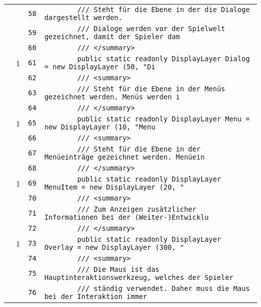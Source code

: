 \documentclass[a4paper,10pt]{article}
\begin{document}
\begin{longtable}[l]{lrrl}
\cellcolor{gray} &  & \verb~58~ & \verb~        /// Steht für die Ebene in der die Dialoge dargestellt werden.~\\
\cellcolor{gray} &  & \verb~59~ & \verb~        /// Dialoge werden vor der Spielwelt gezeichnet, damit der Spieler dam~\\
\cellcolor{gray} &  & \verb~60~ & \verb~        /// </summary>~\\
\cellcolor{green} & 1 & \verb~61~ & \verb~        public static readonly DisplayLayer Dialog = new DisplayLayer (50, "Di~\\
\cellcolor{gray} &  & \verb~62~ & \verb~        /// <summary>~\\
\cellcolor{gray} &  & \verb~63~ & \verb~        /// Steht für die Ebene in der Menüs gezeichnet werden. Menüs werden i~\\
\cellcolor{gray} &  & \verb~64~ & \verb~        /// </summary>~\\
\cellcolor{green} & 1 & \verb~65~ & \verb~        public static readonly DisplayLayer Menu = new DisplayLayer (10, "Menu~\\
\cellcolor{gray} &  & \verb~66~ & \verb~        /// <summary>~\\
\cellcolor{gray} &  & \verb~67~ & \verb~        /// Steht für die Ebene in der Menüeinträge gezeichnet werden. Menüein~\\
\cellcolor{gray} &  & \verb~68~ & \verb~        /// </summary>~\\
\cellcolor{green} & 1 & \verb~69~ & \verb~        public static readonly DisplayLayer MenuItem = new DisplayLayer (20, "~\\
\cellcolor{gray} &  & \verb~70~ & \verb~        /// <summary>~\\
\cellcolor{gray} &  & \verb~71~ & \verb~        /// Zum Anzeigen zusätzlicher Informationen bei der (Weiter-)Entwicklu~\\
\cellcolor{gray} &  & \verb~72~ & \verb~        /// </summary>~\\
\cellcolor{green} & 1 & \verb~73~ & \verb~        public static readonly DisplayLayer Overlay = new DisplayLayer (300, "~\\
\cellcolor{gray} &  & \verb~74~ & \verb~        /// <summary>~\\
\cellcolor{gray} &  & \verb~75~ & \verb~        /// Die Maus ist das Hauptinteraktionswerkzeug, welches der Spieler~\\
\cellcolor{gray} &  & \verb~76~ & \verb~        /// ständig verwendet. Daher muss die Maus bei der Interaktion immer~\\

\end{longtable}
\end{document}
